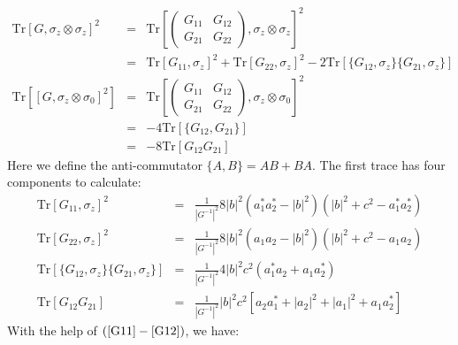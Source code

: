 \documentclass[aps,onecolumn,superscriptaddress,notitlepage,longbibliography]{revtex4-1}
\begin{document}
\begin{eqnarray}
  \text{Tr} [G, \sigma_z \otimes \sigma_z]^2 & = & \text{Tr} \left[
  \left(\begin{array}{cc}
    G_{11} & G_{12}\\
    G_{21} & G_{22}
  \end{array}\right), \sigma_z \otimes \sigma_z \right]^2 \nonumber\\
  & = & \text{Tr} [G_{11}, \sigma_z]^2 + \text{Tr} [G_{22}, \sigma_z]^2 - 2
  \text{Tr} [\{ G_{12}, \sigma_z \} \{ G_{21}, \sigma_z \}] \\
  \text{Tr} [[G, \sigma_z \otimes \sigma_0]^2] & = & \text{Tr} \left[
  \left(\begin{array}{cc}
    G_{11} & G_{12}\\
    G_{21} & G_{22}
  \end{array}\right), \sigma_z \otimes \sigma_0 \right]^2 \nonumber\\
  & = & - 4 \text{Tr} [\{ G_{12}, G_{21} \}] \nonumber\\
  & = & - 8 \text{Tr} [G_{12} G_{21}] 
\end{eqnarray}
Here we define the anti-commutator $\{ A, B \} = A B + B A$. The first trace
has four components to calculate:
\begin{eqnarray}
  \text{Tr} [G_{11}, \sigma_z]^2 & = & \frac{1}{| G^{- 1} |^2} 8 | b |^2
  (a_1^{\ast} a_2^{\ast} - | b |^2) (| b |^2 + c^2 - a_1^{\ast} a_2^{\ast})
  \label{G11} \\
  \text{Tr} [G_{22}, \sigma_z]^2 & = & \frac{1}{| G^{- 1} |^2} 8 | b |^2 (a_1
  a_2 - | b |^2) (| b |^2 + c^2 - a_1 a_2) \\
  \text{Tr} [\{ G_{12}, \sigma_z \} \{ G_{21}, \sigma_z \}] & = & \frac{1}{|
  G^{- 1} |^2} 4 | b |^2 c^2 (a_1^{\ast} a_2 + a_1 a_2^{\ast}) \\
  \text{Tr} [G_{12} G_{21}] & = & \frac{1}{| G^{- 1} |^2} | b |^2 c^2 [a_2
  a_1^{\ast} + | a_2 |^2 + | a_1 |^2 + a_1 a_2^{\ast}] \label{G12} 
\end{eqnarray}
With the help of $\left( \ref{G11} - \ref{G12} \right)$, we have:
\end{document}

